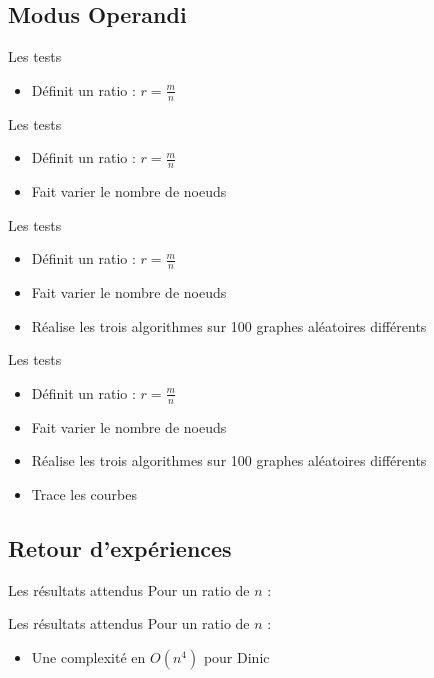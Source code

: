 \documentclass[hyperref={},
xcolor={dvipsnames,svgnames,table},10pt]{beamer}
\begin{document}
\subsection{Modus Operandi}

\begin{frame}{Les tests}
	\begin{itemize}
		\item Définit un ratio : $r = \frac{m}{n}$
	\end{itemize}
\end{frame}

\begin{frame}{Les tests}
	\begin{itemize}
		\item Définit un ratio : $r = \frac{m}{n}$
		\item Fait varier le nombre de noeuds
	\end{itemize}
\end{frame}
\begin{frame}{Les tests}
	\begin{itemize}
		\item Définit un ratio : $r = \frac{m}{n}$
		\item Fait varier le nombre de noeuds
		\item Réalise les trois algorithmes sur 100 graphes aléatoires différents
	\end{itemize}
\end{frame}
\begin{frame}{Les tests}
	\begin{itemize}
		\item Définit un ratio : $r = \frac{m}{n}$
		\item Fait varier le nombre de noeuds
		\item Réalise les trois algorithmes sur 100 graphes aléatoires différents
		\item Trace les courbes
	\end{itemize}
\end{frame}

\subsection{Retour d'expériences}

\begin{frame}{Les résultats attendus}
	Pour un ratio de $n$ : 
\end{frame}

\begin{frame}{Les résultats attendus}
	Pour un ratio de $n$ : \begin{itemize}
		\item Une complexité en $O(n^4)$ pour Dinic
	\end{itemize}
\end{frame}
\end{document}
